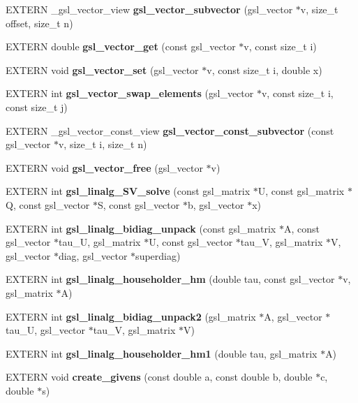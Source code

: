 \begin{CompactItemize}
\item 
EXTERN \_\-gsl\_\-vector\_\-view {\bf gsl\_\-vector\_\-subvector} (gsl\_\-vector $\ast$v, size\_\-t offset, size\_\-t n)
\item 
EXTERN double {\bf gsl\_\-vector\_\-get} (const gsl\_\-vector $\ast$v, const size\_\-t i)
\item 
EXTERN void {\bf gsl\_\-vector\_\-set} (gsl\_\-vector $\ast$v, const size\_\-t i, double x)
\item 
EXTERN int \textbf{gsl\_\-vector\_\-swap\_\-elements} (gsl\_\-vector $\ast$v, const size\_\-t i, const size\_\-t j)\label{group__nr_g2624694e4157398ba344b90eca6ba070}

\item 
EXTERN \_\-gsl\_\-vector\_\-const\_\-view \textbf{gsl\_\-vector\_\-const\_\-subvector} (const gsl\_\-vector $\ast$v, size\_\-t i, size\_\-t n)\label{group__nr_ga45e4b3770af5d15171055314b140838}

\item 
EXTERN void \textbf{gsl\_\-vector\_\-free} (gsl\_\-vector $\ast$v)\label{group__nr_gedc84887915223f87986de6a67c0249d}

\item 
EXTERN int \textbf{gsl\_\-linalg\_\-SV\_\-solve} (const gsl\_\-matrix $\ast$U, const gsl\_\-matrix $\ast$Q, const gsl\_\-vector $\ast$S, const gsl\_\-vector $\ast$b, gsl\_\-vector $\ast$x)\label{group__nr_g8568eb30743233bab6e1c2d530829f5f}

\item 
EXTERN int \textbf{gsl\_\-linalg\_\-bidiag\_\-unpack} (const gsl\_\-matrix $\ast$A, const gsl\_\-vector $\ast$tau\_\-U, gsl\_\-matrix $\ast$U, const gsl\_\-vector $\ast$tau\_\-V, gsl\_\-matrix $\ast$V, gsl\_\-vector $\ast$diag, gsl\_\-vector $\ast$superdiag)\label{group__nr_gc4843a336042d90bbacea983a80e29b9}

\item 
EXTERN int {\bf gsl\_\-linalg\_\-householder\_\-hm} (double tau, const gsl\_\-vector $\ast$v, gsl\_\-matrix $\ast$A)
\item 
EXTERN int \textbf{gsl\_\-linalg\_\-bidiag\_\-unpack2} (gsl\_\-matrix $\ast$A, gsl\_\-vector $\ast$tau\_\-U, gsl\_\-vector $\ast$tau\_\-V, gsl\_\-matrix $\ast$V)\label{group__nr_g4881575010a0877aba5efab6f368ab8c}

\item 
EXTERN int {\bf gsl\_\-linalg\_\-householder\_\-hm1} (double tau, gsl\_\-matrix $\ast$A)
\item 
EXTERN void \textbf{create\_\-givens} (const double a, const double b, double $\ast$c, double $\ast$s)\label{group__nr_g2c1eb13f0c90da0f8ef4ef712db29f44}


\end{CompactItemize}
